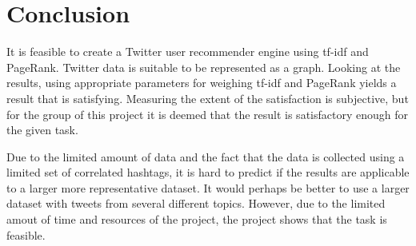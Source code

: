 \section{Conclusion}
\label{sec:conclusion}

It is feasible to create a Twitter user recommender engine using tf-idf and
PageRank. Twitter data is suitable to be represented as a graph. Looking at the
results, using appropriate parameters for weighing tf-idf and PageRank yields a
result that is satisfying. Measuring the extent of the satisfaction is
subjective, but for the group of this project it is deemed that the result is
satisfactory enough for the given task.

Due to the limited amount of data and the fact that the data is collected using
a limited set of correlated hashtags, it is hard to predict if the results are
applicable to a larger more representative dataset. It would perhaps be better
to use a larger dataset with tweets from several different topics. However, due
to the limited amout of time and resources of the project, the project shows
that the task is feasible.
